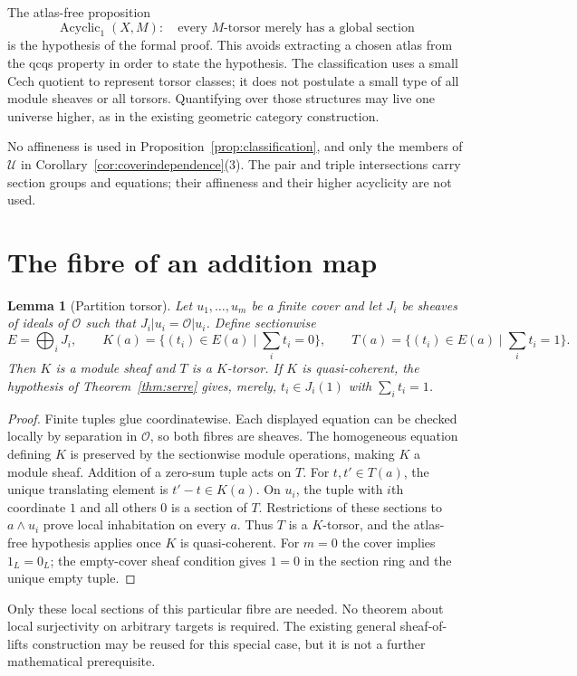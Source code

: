 \documentclass[11pt]{amsart}
\newtheorem{lemma}[theorem]{Lemma}
\theoremstyle{definition}\newtheorem{definition}[theorem]{Definition}
\theoremstyle{remark}\newtheorem{remark}[theorem]{Remark}
\newcommand{\OO}{\mathcal O}
\begin{document}
The atlas-free proposition
\[
 \operatorname{Acyclic}_1(X,M):\quad
 \text{every $M$-torsor merely has a global section}
\]
is the hypothesis of the formal proof. This avoids extracting a chosen
atlas from the qcqs property in order to state the hypothesis.
The classification uses a small Cech quotient to represent torsor
classes; it does not postulate a small type of all module sheaves or
all torsors. Quantifying over those structures may live one universe
higher, as in the existing geometric category construction.

No affineness is used in Proposition~\ref{prop:classification}, and
only the members of $\mathcal U$ in Corollary~\ref{cor:coverindependence}(3).
The pair and triple intersections carry section groups and equations;
their affineness and their higher acyclicity are not used.

\section{The fibre of an addition map}\label{sec:lifting}
\begin{lemma}[Partition torsor]\label{lem:lifts}
Let $u_1,\ldots,u_m$ be a finite cover and let $J_i$ be sheaves of
ideals of $\OO$ such that $J_i|u_i=\OO|u_i$. Define sectionwise
\[
 E=\bigoplus_iJ_i,\qquad
 K(a)=\{(t_i)\in E(a)\mid\sum_i t_i=0\},\qquad
 T(a)=\{(t_i)\in E(a)\mid\sum_i t_i=1\}.
\]
Then $K$ is a module sheaf and $T$ is a $K$-torsor. If $K$ is
quasi-coherent, the hypothesis of Theorem~\ref{thm:serre} gives,
merely, $t_i\in J_i(1)$ with $\sum_i t_i=1$.
\end{lemma}
\begin{proof}
Finite tuples glue coordinatewise. Each displayed equation can be
checked locally by separation in $\OO$, so both fibres are sheaves.
The homogeneous equation defining $K$ is preserved by the sectionwise
module operations, making $K$ a module sheaf.
Addition of a zero-sum tuple acts on $T$. For $t,t'\in T(a)$,
the unique translating element is $t'-t\in K(a)$.
On $u_i$, the tuple with $i$th coordinate $1$ and all others $0$
is a section of $T$. Restrictions of these sections to $a\wedge u_i$
prove local inhabitation on every $a$. Thus $T$ is a $K$-torsor,
and the atlas-free hypothesis applies once $K$ is quasi-coherent.
For $m=0$ the cover implies $1_L=0_L$; the empty-cover sheaf condition
gives $1=0$ in the section ring and the unique empty tuple.
\end{proof}

Only these local sections of this particular fibre are needed.
No theorem about local surjectivity on arbitrary targets is required.
The existing general sheaf-of-lifts construction may be reused for
this special case, but it is not a further mathematical prerequisite.
\end{document}
